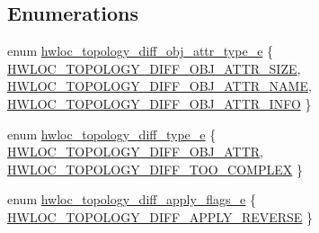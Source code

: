 \subsection*{Enumerations}
\begin{DoxyCompactItemize}
\item 
enum \hyperlink{a00225_ga86f044210b0a9e9fa83acbdbbf7e05fd}{hwloc\+\_\+topology\+\_\+diff\+\_\+obj\+\_\+attr\+\_\+type\+\_\+e} \{ \hyperlink{a00225_gga86f044210b0a9e9fa83acbdbbf7e05fdabc7f0c7ed0b6864e902f4b70f2c7bc94}{H\+W\+L\+O\+C\+\_\+\+T\+O\+P\+O\+L\+O\+G\+Y\+\_\+\+D\+I\+F\+F\+\_\+\+O\+B\+J\+\_\+\+A\+T\+T\+R\+\_\+\+S\+I\+ZE}, 
\hyperlink{a00225_gga86f044210b0a9e9fa83acbdbbf7e05fda94a8f37c51d62d15ac6192665dd49310}{H\+W\+L\+O\+C\+\_\+\+T\+O\+P\+O\+L\+O\+G\+Y\+\_\+\+D\+I\+F\+F\+\_\+\+O\+B\+J\+\_\+\+A\+T\+T\+R\+\_\+\+N\+A\+ME}, 
\hyperlink{a00225_gga86f044210b0a9e9fa83acbdbbf7e05fda63430bf932434bc456282f636d39c2c2}{H\+W\+L\+O\+C\+\_\+\+T\+O\+P\+O\+L\+O\+G\+Y\+\_\+\+D\+I\+F\+F\+\_\+\+O\+B\+J\+\_\+\+A\+T\+T\+R\+\_\+\+I\+N\+FO}
 \}
\item 
enum \hyperlink{a00225_ga38b28b7423b85a3321e6d0062d5f83d0}{hwloc\+\_\+topology\+\_\+diff\+\_\+type\+\_\+e} \{ \hyperlink{a00225_gga38b28b7423b85a3321e6d0062d5f83d0accbcaee230f79989debb284c8626f0c0}{H\+W\+L\+O\+C\+\_\+\+T\+O\+P\+O\+L\+O\+G\+Y\+\_\+\+D\+I\+F\+F\+\_\+\+O\+B\+J\+\_\+\+A\+T\+TR}, 
\hyperlink{a00225_gga38b28b7423b85a3321e6d0062d5f83d0a3dc01fdeff355efe3fb2516bb454a147}{H\+W\+L\+O\+C\+\_\+\+T\+O\+P\+O\+L\+O\+G\+Y\+\_\+\+D\+I\+F\+F\+\_\+\+T\+O\+O\+\_\+\+C\+O\+M\+P\+L\+EX}
 \}
\item 
enum \hyperlink{a00225_gada4c1273ce020afaf02b649496f7edf5}{hwloc\+\_\+topology\+\_\+diff\+\_\+apply\+\_\+flags\+\_\+e} \{ \hyperlink{a00225_ggada4c1273ce020afaf02b649496f7edf5a821a160512d67ea0dd05dab873d2fc54}{H\+W\+L\+O\+C\+\_\+\+T\+O\+P\+O\+L\+O\+G\+Y\+\_\+\+D\+I\+F\+F\+\_\+\+A\+P\+P\+L\+Y\+\_\+\+R\+E\+V\+E\+R\+SE}
 \}
\end{DoxyCompactItemize}
